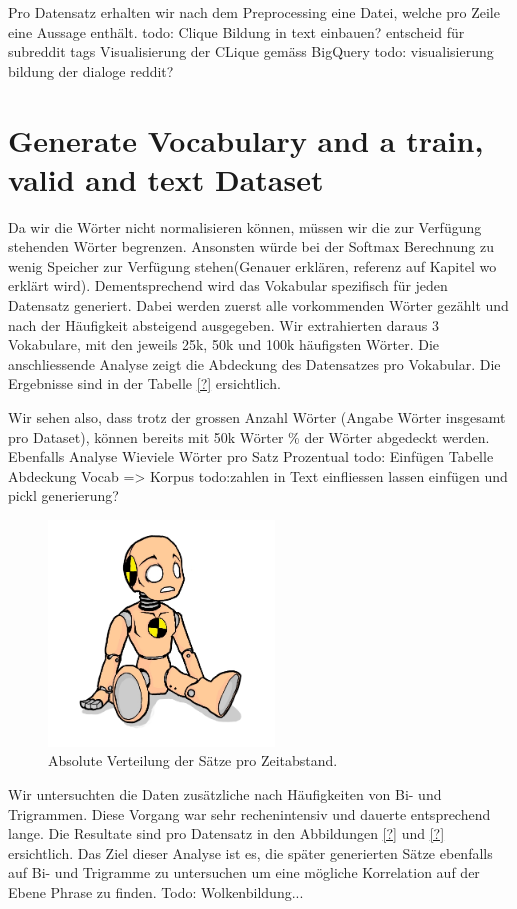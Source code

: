Pro Datensatz erhalten wir nach dem Preprocessing eine Datei, welche pro Zeile eine Aussage enthält.
todo: Clique Bildung in text einbauen? entscheid für subreddit tags Visualisierung der CLique gemäss BigQuery
todo: visualisierung bildung der dialoge reddit?
\section{Generate Vocabulary and a train, valid and text Dataset}
Da wir die Wörter nicht normalisieren können, müssen wir die zur Verfügung stehenden Wörter begrenzen. Ansonsten würde bei der Softmax Berechnung zu wenig Speicher zur Verfügung stehen(Genauer erklären, referenz auf Kapitel wo erklärt wird). Dementsprechend wird das Vokabular spezifisch für jeden Datensatz generiert.
Dabei werden zuerst alle vorkommenden Wörter gezählt und nach der Häufigkeit absteigend ausgegeben. Wir extrahierten daraus 3 Vokabulare, mit den jeweils 25k, 50k und 100k häufigsten Wörter. Die anschliessende Analyse zeigt die Abdeckung des Datensatzes pro Vokabular. Die Ergebnisse sind in der Tabelle \ref{?} ersichtlich.

Wir sehen also, dass trotz der grossen Anzahl Wörter (Angabe Wörter insgesamt pro Dataset), können bereits mit 50k Wörter \% der Wörter abgedeckt werden.
Ebenfalls Analyse Wieviele Wörter pro Satz Prozentual
todo: Einfügen Tabelle Abdeckung Vocab => Korpus
todo:zahlen in Text einfliessen lassen einfügen und pickl generierung?
\begin{figure}[h]
	\label{fig:data:analyse:timediff:opus}
	\centering
	\includegraphics[width=6cm]{img/dummy.png}
	\caption{Absolute Verteilung der Sätze pro Zeitabstand. \protect\footnotemark}
\end{figure}


Wir untersuchten die Daten zusätzliche nach Häufigkeiten von Bi- und Trigrammen. Diese Vorgang war sehr rechenintensiv und dauerte entsprechend lange. Die Resultate sind pro Datensatz in den Abbildungen \ref{?} und \ref{?} ersichtlich. Das Ziel dieser Analyse ist es, die später generierten Sätze ebenfalls auf Bi- und Trigramme zu untersuchen um eine mögliche Korrelation auf der Ebene Phrase zu finden.
Todo: Wolkenbildung...

